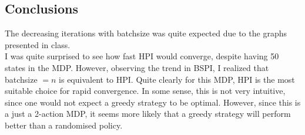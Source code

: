 \documentclass[11pt]{article}
\begin{document}
\subsection{Conclusions}
The decreasing iterations with batchsize was quite expected due to the graphs presented in class. \\
I was quite surprised to see how fast HPI would converge, despite having 50 states in the MDP. However, observing the trend in BSPI, I realized that batchsize $= n$ is equivalent to HPI. Quite clearly for this MDP, HPI is the most suitable choice for rapid convergence. In some sense, this is not very intuitive, since one would not expect a greedy strategy to be optimal. However, since this is a just a 2-action MDP, it seems more likely that a greedy strategy will perform better than a randomised policy.
\end{document}

